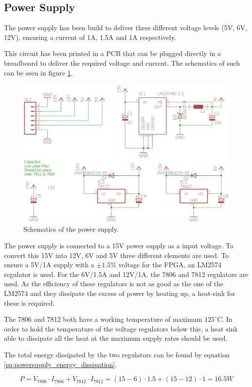 
\subsection{Power Supply}
The power supply has been build to deliver three different voltage levels (5V, 6V, 12V), ensuring a current of 1A, 1.5A and 1A respectively.

This circuit has been printed in a PCB that can be plugged directly in a breadboard to deliver the required voltage and current.
The schematics of such can be seen in figure \ref{fig:powersupply_schematics}.

\begin{figure}[H]
\centering 
\includegraphics[width = 0.7 \textwidth]{images/powersupply_schematics}
\caption{Schematics of the power supply.}
\label{fig:powersupply_schematics}
\end{figure}


The power supply is connected to a 15V power supply as a input voltage. 
To convert this 15V into 12V, 6V and 5V three different elements are used.
To ensure a 5V/1A supply with a $\pm 1.5\%$ voltage for the FPGA, an LM2574 regulator is used. 
For the 6V/1.5A and 12V/1A, the 7806 and 7812 regulators are used. 
As the efficiency of these regulators is not as good as the one of the LM2574 and they dissipate the excess of power by heating up, a heat-sink for these is required.

The 7806 and 7812 both have a working temperature of maximum $125^{\circ} C$.
In order to hold the temperature of the voltage regulators below this, a heat sink able to dissipate all the heat at the maximum supply rates should be used.

The total energy dissipated by the two regulators can be found by equation \ref{eq:powersupply_energy_dissipation}.

\begin{equation}
P = V_{7806} \cdot I_{7806} + V_{7812} \cdot I_{7812} = (15 - 6) \cdot 1.5 + (15 - 12) \cdot 1 = 16.5W
\label{eq:powersupply_energy_dissipation}
\end{equation}



